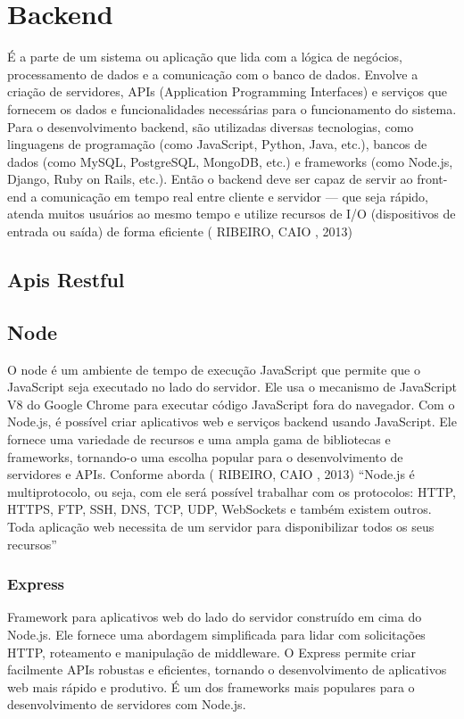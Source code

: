 \section{Backend}
É a parte de um sistema ou aplicação que lida com a lógica de negócios, processamento de dados e a comunicação com o banco de dados. Envolve a criação de servidores, APIs (Application Programming Interfaces) e serviços que fornecem os dados e funcionalidades necessárias para o funcionamento do sistema. Para o desenvolvimento backend, são utilizadas diversas tecnologias, como linguagens de programação (como JavaScript, Python, Java, etc.), bancos de dados (como MySQL, PostgreSQL, MongoDB, etc.) e frameworks (como Node.js, Django, Ruby on Rails, etc.). Então o backend deve ser capaz de servir ao front-end a comunicação em tempo real entre cliente e servidor — que seja rápido, atenda muitos usuários ao mesmo tempo e utilize recursos de I/O (dispositivos de entrada ou saída) de forma eficiente ( RIBEIRO, CAIO , 2013)

\subsection{Apis Restful}

\subsection{Node}
O node é um ambiente de tempo de execução JavaScript que permite que o JavaScript seja executado no lado do servidor. Ele usa o mecanismo de JavaScript V8 do Google Chrome para executar código JavaScript fora do navegador. Com o Node.js, é possível criar aplicativos web e serviços backend usando JavaScript. Ele fornece uma variedade de recursos e uma ampla gama de bibliotecas e frameworks, tornando-o uma escolha popular para o desenvolvimento de servidores e APIs. Conforme aborda  ( RIBEIRO, CAIO , 2013) “Node.js é multiprotocolo, ou seja, com ele será possível trabalhar com os protocolos: HTTP, HTTPS, FTP, SSH, DNS, TCP, UDP, WebSockets e também existem outros.  Toda aplicação web necessita de um servidor para disponibilizar todos os seus  recursos”

\subsubsection{Express}
Framework para aplicativos web do lado do servidor construído em cima do Node.js. Ele fornece uma abordagem simplificada para lidar com solicitações HTTP, roteamento e manipulação de middleware. O Express permite criar facilmente APIs robustas e eficientes, tornando o desenvolvimento de aplicativos web mais rápido e produtivo. É um dos frameworks mais populares para o desenvolvimento de servidores com Node.js.


